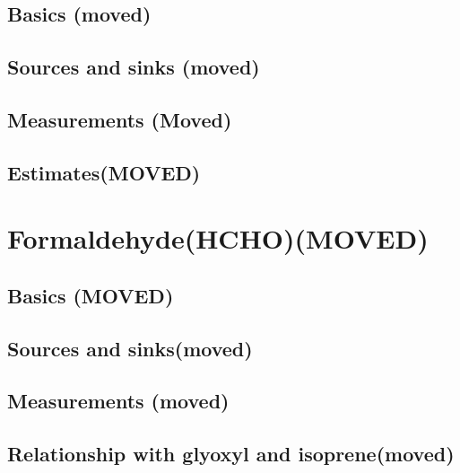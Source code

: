   \subsection{Basics (moved)}
  \subsection{Sources and sinks (moved)}
  \subsection{Measurements (Moved)}
  \subsection{Estimates(MOVED)}
\section{Formaldehyde(HCHO)(MOVED)}
\label{ch_LitRev:sec:HCHO}
  \subsection{Basics (MOVED)}
  \subsection{Sources and sinks(moved)}
  \subsection{Measurements (moved)}
  \subsection{Relationship with glyoxyl and isoprene(moved)}
    
